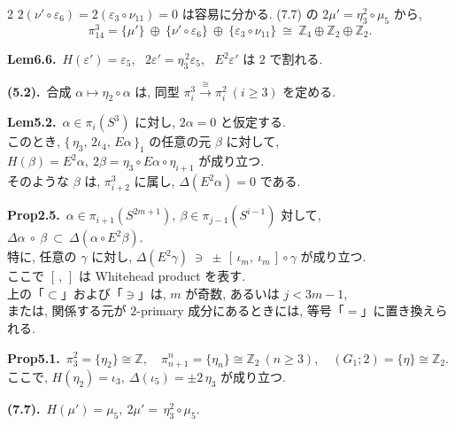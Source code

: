 \documentclass[10pt, leqno]{ltjsarticle}
\newcommand{\todai}[2][]{\{\,#2\,\}_{#1}}      %
\newcommand{\gen}[1]{\{#1\}}       %
\newcommand{\pit}[2]{\pi_{#1}^{#2}}
\numberwithin{equation}{section}
\theoremstyle{plain}
\theoremstyle{definition}
\theoremstyle{remark}
\begin{document}
\begin{paracol}{2}
\(2(\nu'\circ \varepsilon_{6})
=2(\varepsilon_{3}\circ \nu_{11})=0\) は容易に分かる. 
(7.7) の \(2\mu'=\eta_{3}^{2}\circ\mu_{5}\) から,
\[
  \pit{14}{3}
  =\gen{\mu'}\ \oplus\ \gen{\nu'\circ \varepsilon_{6}}\ \oplus\ \gen{\varepsilon_{3}\circ \nu_{11}}
  \ \cong\ \mathbb Z_{4}\oplus\mathbb Z_{2}\oplus\mathbb Z_{2}.
\]

\switchcolumn

\noindent
\textbf{Lem6.6.}\
\(H(\varepsilon')=\varepsilon_{5}\), \
\(2\varepsilon'=\eta_{3}^{\,2}\varepsilon_{5}\), \
\(E^{2}\varepsilon'\) は $2$ で割れる. 

\noindent
\textbf{(5.2).}\
\(\text{合成 } \alpha\longmapsto \eta_2\circ \alpha \text{ は, 同型 } 
\pi^{3}_{i}\xrightarrow{\cong}\pi^{2}_{i}\ (i\ge3) 
\text{ を定める. }\)

\noindent
\textbf{Lem5.2.}\
\(\alpha\in\pi_{i}(S^{3})\) に対し,
\(2\alpha=0\) と仮定する. \\
このとき,
\(\todai[1]{\eta_3,\,2\iota_4,\,E\alpha}\) 
の任意の元 \(\beta\) に対して,\\
\(
H(\beta)=E^{2}\alpha,\
2\beta=\eta_3\circ E\alpha\circ \eta_{i+1}
\)
が成り立つ. \\
そのような \(\beta\) は,
\(\pi^{3}_{i+2}\) に属し, \(\Delta(E^{2}\alpha)=0\) である. 

\noindent
\textbf{Prop2.5.}\
$\alpha\in\pi_{i+1}(S^{2m+1}), \ \beta\in \pi_{j-1}(S^{i-1})$ 対して, 
\(
\Delta\alpha\ \circ\ \beta\ \subset\ \Delta(\alpha\circ E^2\beta).
\)\\
特に, 任意の $\gamma$ に対し,
\(
\Delta(E^2\gamma)\ \ni\ \pm\,[\,\iota_m,\ \iota_m\,]\circ\gamma
\)
が成り立つ. \\
ここで $[\, ,\,]$ は Whitehead product を表す. \\
上の「$\subset$」および「$\ni$」は, $m$ が奇数, 
あるいは $j<3m-1$, \\
または, 関係する元が \(2\)-primary 成分にあるときには, 
等号「$=$」に置き換えられる. 

\noindent
\textbf{Prop5.1.}\
\(\pi^{2}_{3}=\gen{\eta_2}\cong\mathbb Z,\quad
\pi^{n}_{n+1}=\gen{\eta_n}\cong\mathbb Z_2\ (n\ge3),\quad
(G_1;2)=\gen{\eta}\cong\mathbb Z_2.\) \\
ここで, 
\(H(\eta_2)=\iota_3,\ \Delta(\iota_5)=\pm 2\,\eta_3\) が成り立つ. 

\noindent
\textbf{(7.7).}\
\(H(\mu')=\mu_{5},\ 2\mu'=\,\eta_{3}^{2}\circ \mu_{5}.\)






\end{paracol}
\end{document}
